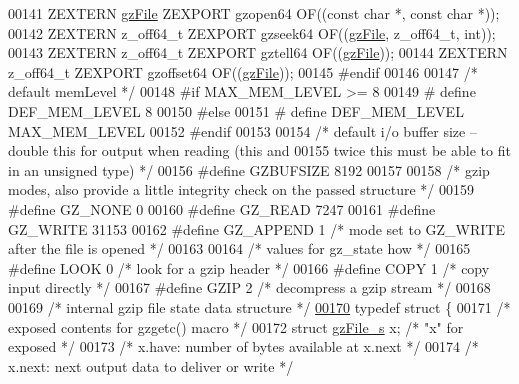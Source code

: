 \begin{DoxyCode}
00141     ZEXTERN \hyperlink{structgz_file__s}{gzFile} ZEXPORT gzopen64 OF((\textcolor{keyword}{const} \textcolor{keywordtype}{char} *, \textcolor{keyword}{const} \textcolor{keywordtype}{char} *));
00142     ZEXTERN z\_off64\_t ZEXPORT gzseek64 OF((\hyperlink{structgz_file__s}{gzFile}, z\_off64\_t, \textcolor{keywordtype}{int}));
00143     ZEXTERN z\_off64\_t ZEXPORT gztell64 OF((\hyperlink{structgz_file__s}{gzFile}));
00144     ZEXTERN z\_off64\_t ZEXPORT gzoffset64 OF((\hyperlink{structgz_file__s}{gzFile}));
00145 \textcolor{preprocessor}{#endif}
00146 
00147 \textcolor{comment}{/* default memLevel */}
00148 \textcolor{preprocessor}{#if MAX\_MEM\_LEVEL >= 8}
00149 \textcolor{preprocessor}{#  define DEF\_MEM\_LEVEL 8}
00150 \textcolor{preprocessor}{#else}
00151 \textcolor{preprocessor}{#  define DEF\_MEM\_LEVEL  MAX\_MEM\_LEVEL}
00152 \textcolor{preprocessor}{#endif}
00153 
00154 \textcolor{comment}{/* default i/o buffer size -- double this for output when reading (this and}
00155 \textcolor{comment}{   twice this must be able to fit in an unsigned type) */}
00156 \textcolor{preprocessor}{#define GZBUFSIZE 8192}
00157 
00158 \textcolor{comment}{/* gzip modes, also provide a little integrity check on the passed structure */}
00159 \textcolor{preprocessor}{#define GZ\_NONE 0}
00160 \textcolor{preprocessor}{#define GZ\_READ 7247}
00161 \textcolor{preprocessor}{#define GZ\_WRITE 31153}
00162 \textcolor{preprocessor}{#define GZ\_APPEND 1     }\textcolor{comment}{/* mode set to GZ\_WRITE after the file is opened */}\textcolor{preprocessor}{}
00163 
00164 \textcolor{comment}{/* values for gz\_state how */}
00165 \textcolor{preprocessor}{#define LOOK 0      }\textcolor{comment}{/* look for a gzip header */}\textcolor{preprocessor}{}
00166 \textcolor{preprocessor}{#define COPY 1      }\textcolor{comment}{/* copy input directly */}\textcolor{preprocessor}{}
00167 \textcolor{preprocessor}{#define GZIP 2      }\textcolor{comment}{/* decompress a gzip stream */}\textcolor{preprocessor}{}
00168 
00169 \textcolor{comment}{/* internal gzip file state data structure */}
\hyperlink{structgz__state}{00170} \textcolor{keyword}{typedef} \textcolor{keyword}{struct }\{
00171         \textcolor{comment}{/* exposed contents for gzgetc() macro */}
00172     \textcolor{keyword}{struct }\hyperlink{structgz_file__s}{gzFile\_s} x;      \textcolor{comment}{/* "x" for exposed */}
00173                             \textcolor{comment}{/* x.have: number of bytes available at x.next */}
00174                             \textcolor{comment}{/* x.next: next output data to deliver or write */}

\end{DoxyCode}
